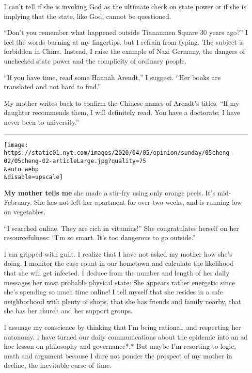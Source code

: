 I can't tell if she is invoking God as the ultimate check on state power
or if she is implying that the state, like God, cannot be questioned.

``Don't you remember what happened outside Tiananmen Square 30 years
ago?'' I feel the words burning at my fingertips, but I refrain from
typing. The subject is forbidden in China. Instead, I raise the example
of Nazi Germany, the dangers of unchecked state power and the complicity
of ordinary people.

``If you have time, read some Hannah Arendt,'' I suggest. ``Her books
are translated and not hard to find.''

My mother writes back to confirm the Chinese names of Arendt's titles.
``If my daughter recommends them, I will definitely read. You have a
doctorate; I have never been to university.''

\begin{center}\rule{0.5\linewidth}{\linethickness}\end{center}

\texttt{[image: https://static01.nyt.com/images/2020/04/05/opinion/sunday/05cheng-02/05cheng-02-articleLarge.jpg?quality=75\\\&auto=webp\\\&disable=upscale]}

\textbf{My mother tells me} she made a stir-fry using only orange peels.
It's mid-February. She has not left her apartment for over two weeks,
and is running low on vegetables.

``I searched online. They are rich in vitamins!'' She congratulates
herself on her resourcefulness: ``I'm so smart. It's too dangerous to go
outside.''

I am gripped with guilt. I realize that I have not asked my mother how
she's doing. I monitor the case count in our hometown and calculate the
likelihood that she will get infected. I deduce from the number and
length of her daily messages her most probable physical state: She
appears rather energetic since she's spending so much time online! I
tell myself that she resides in a safe neighborhood with plenty of
shops, that she has friends and family nearby, that she has her church
and her support groups.

I assuage my conscience by thinking that I'm being rational, and
respecting her autonomy. I have turned our daily communications about
the epidemic into an ad hoc lesson on philosophy and governance*.* But
maybe I'm resorting to logic, math and argument because I dare not
ponder the prospect of my mother in decline, the inevitable curse of
time.

